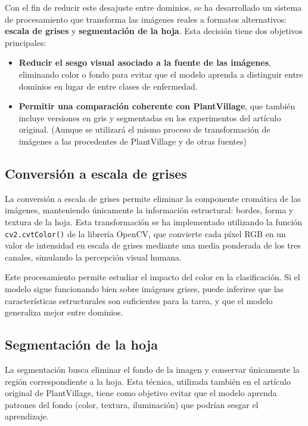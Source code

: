 \documentclass[11pt,spanish,listoffigures,listoftables]{tfgetsinf}
\begin{document}
Con el fin de reducir este desajuste entre dominios, se ha desarrollado un sistema de procesamiento que transforma las imágenes reales a formatos alternativos: \textbf{escala de grises} y \textbf{segmentación de la hoja}. Esta decisión tiene dos objetivos principales:
\begin{itemize}
    \item \textbf{Reducir el sesgo visual asociado a la fuente de las imágenes}, eliminando color o fondo para evitar que el modelo aprenda a distinguir entre dominios en lugar de entre clases de enfermedad.
    \item \textbf{Permitir una comparación coherente con PlantVillage}, que también incluye versiones en gris y segmentadas en los experimentos del artículo original. (Aunque se utilizará el mismo proceso de transformación de imágenes a las procedentes de PlantVillage y de otras fuentes)
\end{itemize}

\subsection{Conversión a escala de grises}

La conversión a escala de grises permite eliminar la componente cromática de las imágenes, manteniendo únicamente la información estructural: bordes, forma y textura de la hoja. Esta transformación se ha implementado utilizando la función \texttt{cv2.cvtColor()} de la librería OpenCV, que convierte cada píxel RGB en un valor de intensidad en escala de grises mediante una media ponderada de los tres canales, simulando la percepción visual humana.

Este procesamiento permite estudiar el impacto del color en la clasificación. Si el modelo sigue funcionando bien sobre imágenes grises, puede inferirse que las características estructurales son suficientes para la tarea, y que el modelo generaliza mejor entre dominios.

\subsection{Segmentación de la hoja}

La segmentación busca eliminar el fondo de la imagen y conservar únicamente la región correspondiente a la hoja. Esta técnica, utilizada también en el artículo original de PlantVillage, tiene como objetivo evitar que el modelo aprenda patrones del fondo (color, textura, iluminación) que podrían sesgar el aprendizaje. 
\end{document}
